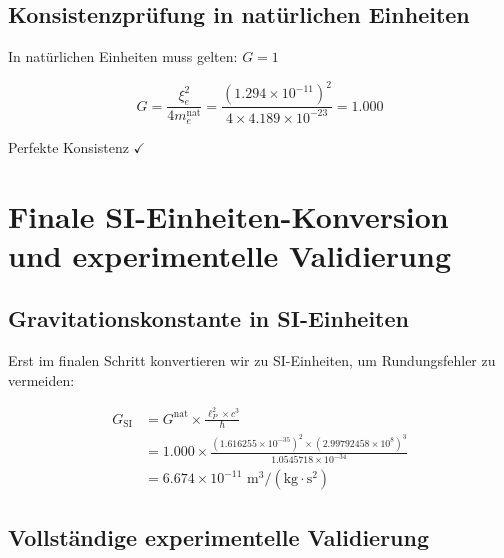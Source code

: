 \documentclass[12pt,a4paper]{article}
\begin{document}
	\subsection{Konsistenzprüfung in natürlichen Einheiten}
	
	In natürlichen Einheiten muss gelten: $G = 1$
	
	\begin{equation}
		G = \frac{\xi_e^2}{4m_e^{\text{nat}}} = \frac{(1.294 \times 10^{-11})^2}{4 \times 4.189 \times 10^{-23}} = 1.000
	\end{equation}
	
	Perfekte Konsistenz $\checkmark$
	
	\section{Finale SI-Einheiten-Konversion und experimentelle Validierung}
	
	\subsection{Gravitationskonstante in SI-Einheiten}
	
	Erst im finalen Schritt konvertieren wir zu SI-Einheiten, um Rundungsfehler zu vermeiden:
	
	\begin{align}
		G_{\text{SI}} &= G^{\text{nat}} \times \frac{\ell_P^2 \times c^3}{\hbar}\\
		&= 1.000 \times \frac{(1.616255 \times 10^{-35})^2 \times (2.99792458 \times 10^8)^3}{1.0545718 \times 10^{-34}}\\
		&= 6.674 \times 10^{-11} \text{ m}^3/(\text{kg} \cdot \text{s}^2)
	\end{align}
	
	\subsection{Vollständige experimentelle Validierung}
	
\end{document}
